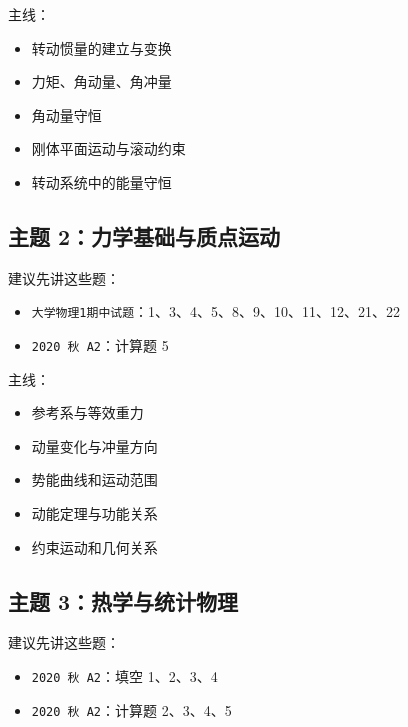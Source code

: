 \documentclass[12pt,a4paper]{ctexart}
\begin{document}
主线：

\begin{itemize}

\item 转动惯量的建立与变换

\item 力矩、角动量、角冲量

\item 角动量守恒

\item 刚体平面运动与滚动约束

\item 转动系统中的能量守恒

\end{itemize}

\subsection{主题 2：力学基础与质点运动}

建议先讲这些题：

\begin{itemize}

\item \texttt{大学物理1期中试题}：1、3、4、5、8、9、10、11、12、21、22

\item \texttt{2020 秋 A2}：计算题 5

\end{itemize}

主线：

\begin{itemize}

\item 参考系与等效重力

\item 动量变化与冲量方向

\item 势能曲线和运动范围

\item 动能定理与功能关系

\item 约束运动和几何关系

\end{itemize}

\subsection{主题 3：热学与统计物理}

建议先讲这些题：

\begin{itemize}

\item \texttt{2020 秋 A2}：填空 1、2、3、4

\item \texttt{2020 秋 A2}：计算题 2、3、4、5

\end{itemize}
\end{document}
